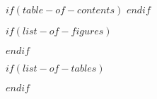 $if(table-of-contents)$
\setcounter{secnumdepth}{5}
\tableofcontents
\clearpage
$endif$

$if(list-of-figures)$
\listoffigures
{}
\clearpage
$endif$

$if(list-of-tables)$
\listoftables
{}
\clearpage
$endif$